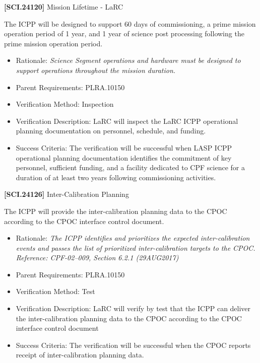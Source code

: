 \textbf{[SCI.24120]} Mission Lifetime - \gls{LaRC}

The \gls{ICPP} will be designed to support 60 days of commissioning, a prime mission operation period of 1 year, and 1 year of science post processing following the prime mission operation period.

\begin{itemize}
\item{} Rationale: \emph{Science Segment operations and hardware must be designed to support operations throughout the mission duration.}

\item{} Parent Requirements: PLRA.10150

\item{} Verification Method: Inspection

\item{} Verification Description: \gls{LaRC} will inspect the \gls{LaRC} \gls{ICPP} operational planning documentation on personnel, schedule, and funding.

\item{} Success Criteria: The verification will be successful when \gls{LASP} \gls{ICPP} operational planning documentation identifies the commitment of key personnel, sufficient funding, and a facility dedicated to \gls{CPF} science for a duration of at least two years following commissioning activities.

\end{itemize}

\textbf{[SCI.24126]} Inter-Calibration Planning

The \gls{ICPP} will provide the inter-calibration planning data to the \gls{CPOC} according to the \gls{CPOC} interface control document.

\begin{itemize}
\item{} Rationale: \emph{The ICPP identifies and prioritizes the expected inter-calibration events and passes the list of prioritized inter-calibration targets to the CPOC. Reference: CPF-02--009, Section 6.2.1 (29AUG2017)}

\item{} Parent Requirements: PLRA.10150

\item{} Verification Method: Test

\item{} Verification Description: \gls{LaRC} will verify by \gls{test} that the \gls{ICPP} can deliver the inter-calibration planning data to the \gls{CPOC} according to the \gls{CPOC} interface control document

\item{} Success Criteria: The verification will be successful when the \gls{CPOC} reports receipt of inter-calibration planning data.

\end{itemize}

